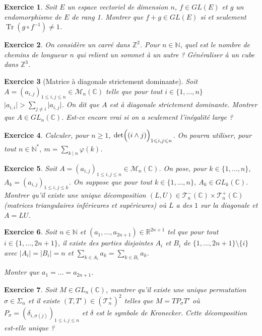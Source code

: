 \documentclass[12pt]{article}
\newtheorem{exercise}{Exercice}[section]
\theoremstyle{remark}
\theoremstyle{remark}
\newcommand{\R}{\mathbb{R}}
\newcommand{\C}{\mathbb{C}}
\newcommand{\N}{\mathbb{N}}
\newcommand{\Z}{\mathbb{Z}}
\newcommand{\M}{\mathcal{M}}
\DeclareMathOperator{\Tr}{Tr}
\begin{document}
\begin{exercise}
	Soit $E$ un espace vectoriel de dimension $n$, $f\in GL(E)$ et $g$ un
	endomorphisme de $E$ de rang 1. Montrer que $f+g\in GL(E)$ si et seulement
	$\Tr(g\circ f^{-1})\neq 1$.
\end{exercise}

\begin{exercise}
	On considère un carré dans $\Z^{2}$. Pour $n\in\N$, quel est le nombre de
	chemins de longueur $n$ qui relient un sommet à un autre ? Généraliser à un cube dans $\Z^{3}$.
\end{exercise}

\begin{exercise}[Matrice à diagonale strictement dominante]
	Soit $A=(a_{i,j})_{1\leqslant i,j\leqslant n}\in\M_{n}(\C)$ telle que pour
	tout $i\in\{1,\dots,n\}$$\vert a_{i,i}\vert>\sum_{j\neq i}\vert
	a_{i,j}\vert$. On dit que $A$ est à diagonale strictement dominante. Montrer
	que $A\in GL_{n}(\C)$. Est-ce encore vrai si on a seulement l'inégalité large ?
\end{exercise}

\begin{exercise}
	Calculer, pour $n\geqslant1$, $\det\Bigl((i\wedge j)\Bigr)_{1\leqslant
	i,j\leqslant n}$. On pourra utiliser, pour tout $n\in\N^{*}
	,~m=\sum_{k\mid n}\varphi(k)$.
\end{exercise}

\begin{exercise}
	Soit $A=(a_{i,j})_{1\leqslant i,j\leqslant n}\in\M_{n}(\C)$. On pose, pour
	$k\in\{1,\dots, n\}$,$A_{k}=(a_{i,j})_{1\leqslant i,j\leqslant k}$. On
	suppose que pour tout $k\in\{1,\dots,n\},~A_{k}\in GL_{k}(\C)$. Montrer
	qu'il existe une unique décomposition
	$(L,U)\in\mathcal{T}_{n}^{-}(\C)\times\mathcal{T}_{n}^{+}(\C)$ (matrices
	triangulaires inférieures et supérieures) où $L$ a des
	$1$ sur la diagonale et $A=LU$.
\end{exercise}

\begin{exercise}
	Soit $n\in\N$ et $(a_{1},\dots,a_{2n+1})\in\R^{2n+1}$ tel que pour tout
	$i\in\{1,\dots,2n+1\}$, il existe des parties disjointes $A_{i}$ et $B_{i}$
	de $\{1,\dots,2n+1\}\setminus\{i\}$ avec $\vert A_{i}\vert=\vert
	B_{i}\vert=n$ et $\sum_{k\in A_{i}}a_{k}=\sum_{k\in B_{i}}a_{k}$.

	Monter que $a_{1}=\dots=a_{2n+1}$.
\end{exercise}

\begin{exercise}
	Soit $M\in GL_{n}(\C)$, montrer qu'il existe une unique permutation
	$\sigma\in\Sigma_{n}$ et il existe $(T,T')\in(\mathcal{T}_{n}^{+})^{2}$
	telles que $M=TP_{\sigma}T'$ où
	$P_{\sigma}=(\delta_{i,\sigma(j)})_{1\leqslant i,j\leqslant n}$ et $\delta$
	est le symbole de Kronecker. Cette décomposition est-elle unique ?
\end{exercise}
\end{document}
